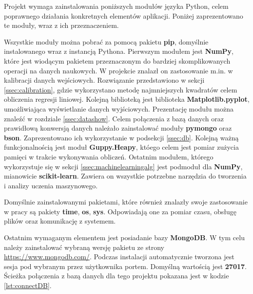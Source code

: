 Projekt wymaga zainstalowania poniższych modułów języka Python, celem poprawnego działania konkretnych elementów aplikacji. Poniżej zaprezentowano te moduły, wraz z ich przeznaczeniem.\par
Wszystkie moduły można pobrać za pomocą pakietu \textbf{pip}, domyślnie instalowanego wraz z instancją Pythona. Pierwszym modułem jest \textbf{NumPy}, które jest wiodącym pakietem przeznaczonym do bardziej skomplikowanych operacji na danych naukowych. W projekcie znalazł on zastosowanie m.in. w kalibracji danych wejściowych. Rozwiązanie przedstawiono w sekcji \ref{ssec:calibration}, gdzie wykorzystano metodę najmniejszych kwadratów celem obliczenia regresji liniowej. Kolejną biblioteką jest biblioteka \textbf{Matplotlib.pyplot}, umożliwiająca wyświetlanie danych wyjściowych. Prezentację modułu można znaleźć w rozdziale \ref{ssec:datashow}. Celem połączenia z bazą danych oraz prawidłową konwersją danych należało zainstalować moduły \textbf{pymongo} oraz \textbf{bson}. Zaprezentowano ich wykorzystanie w podsekcji \ref{ssec:db}. Kolejną ważną funkcjonalnością jest moduł \textbf{Guppy.Heapy}, któego celem jest pomiar zużycia pamięci w trakcie wykonywania obliczeń. Ostatnim modułem, którego wykorzystuje się w sekcji \ref{ssec:machinelearningalg} jest podmoduł dla \textbf{NumPy}, mianowicie \textbf{scikit-learn}. Zawiera on wszystkie potrzebne narzędzia do tworzenia i analizy uczenia maszynowego.\par
Domyślnie zainstalowanymi pakietami, które również znalazły swoje zastosowanie w pracy są pakiety \textbf{time}, \textbf{os}, \textbf{sys}. Odpowiadają one za pomiar czasu, obsługę plików oraz komunikację z systemem.\par
Ostatnim wymaganym elementem jest posiadanie bazy \textbf{MongoDB}. W tym celu należy zainstalować wybraną wersję pakietu ze strony \url{https://www.mongodb.com/}. Podczas instalacji automatycznie tworzona jest sesja pod wybranym przez użytkownika portem. Domyślną wartością jest \textbf{27017}. Ścieżka połączenia z bazą danych dla tego projektu pokazana jest w kodzie \ref{lst:connectDB}.
